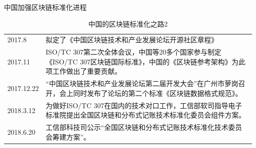\documentclass[11pt]{beamer}
\begin{document}
\begin{frame}[allowframebreaks]{中国加强区块链标准化进程}
\begin{table}[]
\begin{tabular}{p{}p{}}
			2017.8     & 拟定了《中国区块链技术和产业发展论坛开源社区章程》                                                                                                                                                                                        \\
			2017.11    & ISO/TC 307第二次全体会议，中国等20多个国家参与制定《ISO/TC 307区块链国际标准》，中国的《区块链参考架构》为此项工作做出了重要贡献。                                                                                                        \\
			2017.12.22 & “中国区块链技术和产业发展论坛第二届开发大会”在广州市萝岗召开，会上同时发布了论坛的第二个标准《区块链数据格式规范》。                                                                                                                      \\
			2018.3.12  & 为做好ISO/TC 307在国内的技术对口工作，工信部软司指导电子标准院提出全国区块链和分布式记账技术标准化委员会组件方案。                                                                                                                        \\
			2018.6.20  & 工信部科技司公示“全国区块链和分布式记账技术标准化技术委员会筹建方案”。                                                                                                                                                                    \\
			\bottomrule
		\end{tabular}
		\caption{中国的区块链标准化之路2}
	\end{table}
\end{frame}
\end{document}
